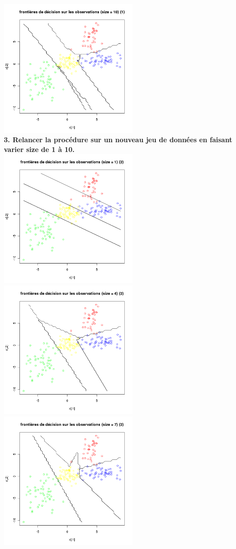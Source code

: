 \documentclass[a4paper, 10pt]{article}
\begin{document}
\includegraphics[height = 7cm, width = 7cm]{plots/frontiere_bayes_q3_2_10.png}\\
\textbf{3. Relancer la procédure sur un nouveau jeu de données en faisant varier size de 1 à 10.}\\
\includegraphics[height = 7cm, width = 7cm]{plots/frontiere_bayes_q3_3_1.png}
\includegraphics[height = 7cm, width = 7cm]{plots/frontiere_bayes_q3_3_4.png}\\
\includegraphics[height = 7cm, width = 7cm]{plots/frontiere_bayes_q3_3_7.png}
\end{document}
